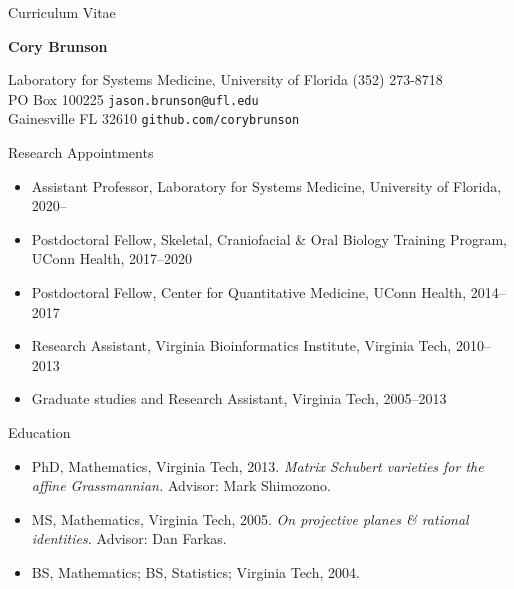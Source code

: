 \documentclass[10pt,a4paper]{article}
\begin{document}
\frenchspacing
\pagestyle{empty}
\setlength{\parindent}{0cm}

\centerline{\sc Curriculum Vitae}
\vspace{.25cm}
\centerline{\large\bfseries Cory Brunson}

\vspace{.75cm}
Laboratory for Systems Medicine, University of Florida \hfill (352) 273-8718 \\
PO Box 100225 \hfill {\tt\small jason.brunson@ufl.edu} \\
Gainesville FL 32610 \hfill {\tt\small\nolinkurl{github.com/corybrunson}}

\vspace{.25cm}
{\sc Research Appointments}
\begin{itemize}[label=$\circ$,nolistsep]
\item
Assistant Professor, Laboratory for Systems Medicine, University of Florida, 2020--
\item
Postdoctoral Fellow, Skeletal, Craniofacial \& Oral Biology Training Program, UConn Health, 2017--2020
\item
Postdoctoral Fellow, Center for Quantitative Medicine, UConn Health, 2014--2017
\item
Research Assistant, Virginia Bioinformatics Institute, Virginia Tech, 2010--2013
\item
Graduate studies and Research Assistant, Virginia Tech, 2005--2013
\end{itemize}

\vspace{.25cm}
{\sc Education}
\begin{itemize}[label=$\circ$,nolistsep]
\item
PhD, Mathematics, Virginia Tech, 2013.
{\itshape Matrix Schubert varieties for the affine Grassmannian.}
Advisor: Mark Shimozono.
\item
MS, Mathematics, Virginia Tech, 2005.
{\itshape On projective planes \& rational identities.}
Advisor: Dan Farkas.
\item
BS, Mathematics; BS, Statistics; Virginia Tech, 2004.
\end{itemize}

\end{document}
